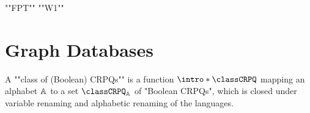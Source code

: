 \begin{itemize}
	\itemAP ""FPT""
	\itemAP ""W1""
\end{itemize}

\section{Graph Databases}


A \AP""class of (Boolean) CRPQs"" is a function \AP$\intro*\classCRPQ$ mapping an alphabet $\mathbb{A}$ 
to a set $\classCRPQ_{\A}$ of "Boolean CRPQs", which is closed under variable renaming and alphabetic
renaming of the languages.



